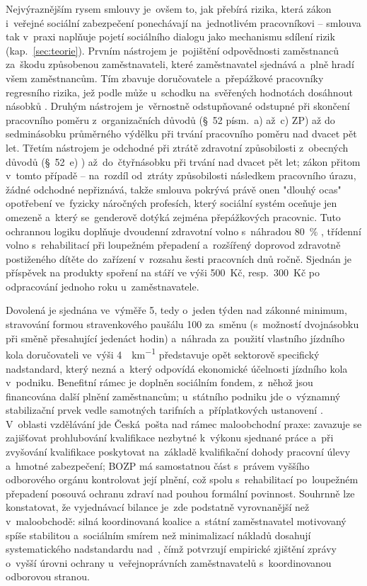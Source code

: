 Nejvýraznějším rysem smlouvy je~ovšem to, jak  přebírá rizika, která zákon i~veřejné sociální zabezpečení ponechávají na~jednotlivém pracovníkovi -- smlouva tak v~praxi naplňuje pojetí sociálního dialogu jako mechanismu sdílení rizik (kap.~\ref{sec:teorie}).
Prvním nástrojem je~pojištění odpovědnosti zaměstnanců za~škodu způsobenou zaměstnavateli, které zaměstnavatel sjednává a~plně hradí všem zaměstnancům. Tím zbavuje doručovatele a~přepážkové pracovníky regresního rizika, jež podle  může u~schodku na~svěřených hodnotách dosáhnout násobků .
Druhým nástrojem je~věrnostně odstupňované odstupné při skončení pracovního poměru z~organizačních důvodů (\S~52 písm.~a) až~c) \acs{ZP}) až do sedminásobku průměrného výdělku při trvání pracovního poměru nad dvacet pět let. Třetím nástrojem je odchodné při ztrátě zdravotní způsobilosti z~obecných důvodů (\mbox{§~52~e)} ) až~do~čtyřnásobku  při trvání  nad dvacet pět let; zákon přitom v~tomto případě -- na~rozdíl od~ztráty způsobilosti následkem pracovního úrazu, žádné odchodné nepřiznává, takže smlouva pokrývá právě onen "dlouhý ocas" opotřebení ve~fyzicky náročných profesích, který sociální systém oceňuje jen omezeně a~který se~genderově dotýká zejména přepážkových pracovnic.
Tuto ochrannou logiku doplňuje dvoudenní zdravotní volno s~náhradou \SI{80}{\percent} , třídenní volno s~rehabilitací při loupežném přepadení a~rozšířený doprovod zdravotně postiženého dítěte do~zařízení v~rozsahu šesti pracovních dnů ročně. Sjednán je příspěvek na produkty spoření na stáří ve výši 500~Kč, resp.~300~Kč po odpracování jednoho roku u~zaměstnavatele.\par
Dovolená je sjednána ve~výměře \SI{5}{\week}, tedy o~jeden týden nad zákonné minimum, stravování formou stravenkového paušálu \SI{100}{\czk} za~směnu (s~možností dvojnásobku při směně přesahující jedenáct hodin) a~náhrada za~použití vlastního jízdního kola doručovateli ve~výši \SI{4}{\czk\per\kilo\meter} představuje opět sektorově specifický nadstandard, který  nezná a~který odpovídá ekonomické účelnosti jízdního kola v~podniku.
Benefitní rámec je doplněn sociálním fondem, z~něhož jsou financována další plnění zaměstnancům; u~státního podniku jde o~významný stabilizační prvek vedle samotných tarifních a~příplatkových ustanovení .
V~oblasti vzdělávání jde Česká~pošta nad rámec maloobchodní praxe: zavazuje se zajišťovat prohlubování kvalifikace nezbytné k~výkonu sjednané práce a~při zvyšování kvalifikace poskytovat na~základě kvalifikační dohody pracovní úlevy a~hmotné zabezpečení; \acs{BOZP} má samostatnou část s~právem vyššího odborového orgánu kontrolovat její plnění, což spolu s~rehabilitací po~loupežném přepadení posouvá ochranu zdraví nad pouhou formální povinnost.
Souhrnně lze konstatovat, že vyjednávací bilance je~zde podstatně vyrovnanější než v~maloobchodě: silná koordinovaná koalice a~státní zaměstnavatel motivovaný spíše stabilitou a~sociálním smírem než minimalizací nákladů dosahují systematického nadstandardu nad~, čímž potvrzují empirické zjištění zprávy  o~vyšší úrovni ochrany u~veřejnoprávních zaměstnavatelů s~koordinovanou odborovou stranou.~\cite{KS_CeskaPosta_2025}~\cite{CMKOS_ZpravaKV2025}~\cite{CMKOS_PrinosKV2025}\par
